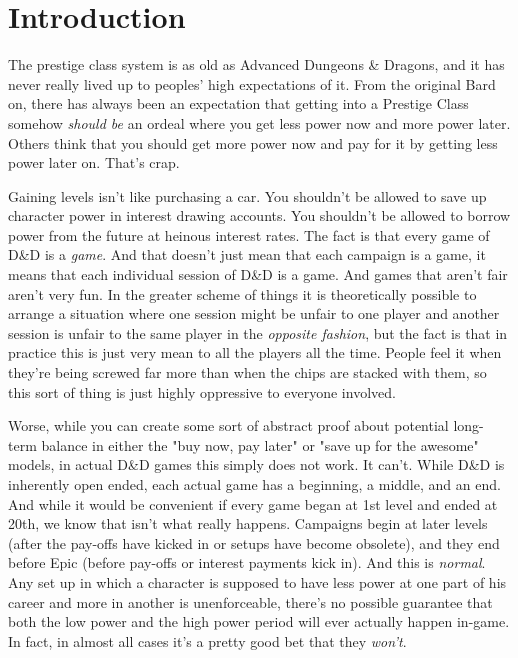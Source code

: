 \section{Introduction}

The prestige class system is as old as Advanced Dungeons \& Dragons, and it has never really lived up to peoples' high expectations of it. From the original Bard on, there has always been an expectation that getting into a Prestige Class somehow \emph{should be} an ordeal where you get less power now and more power later. Others think that you should get more power now and pay for it by getting less power later on. That's crap.

Gaining levels isn't like purchasing a car. You shouldn't be allowed to save up character power in interest drawing accounts. You shouldn't be allowed to borrow power from the future at heinous interest rates. The fact is that every game of D\&D is a \emph{game}. And that doesn't just mean that each campaign is a game, it means that each individual session of D\&D is a game. And games that aren't fair aren't very fun. In the greater scheme of things it is theoretically possible to arrange a situation where one session might be unfair to one player and another session is unfair to the same player in the \emph{opposite fashion}, but the fact is that in practice this is just very mean to all the players all the time. People feel it when they're being screwed far more than when the chips are stacked with them, so this sort of thing is just highly oppressive to everyone involved.

Worse, while you can create some sort of abstract proof about potential long-term balance in either the "buy now, pay later" or "save up for the awesome" models, in actual D\&D games this simply does not work. It can't. While D\&D is inherently open ended, each actual game has a beginning, a middle, and an end. And while it would be convenient if every game began at 1st level and ended at 20th, we know that isn't what really happens. Campaigns begin at later levels (after the pay-offs have kicked in or setups have become obsolete), and they end before Epic (before pay-offs or interest payments kick in). And this is \emph{normal}. Any set up in which a character is supposed to have less power at one part of his career and more in another is unenforceable, there's no possible guarantee that both the low power and the high power period will ever actually happen in-game. In fact, in almost all cases it's a pretty good bet that they \emph{won't}.

